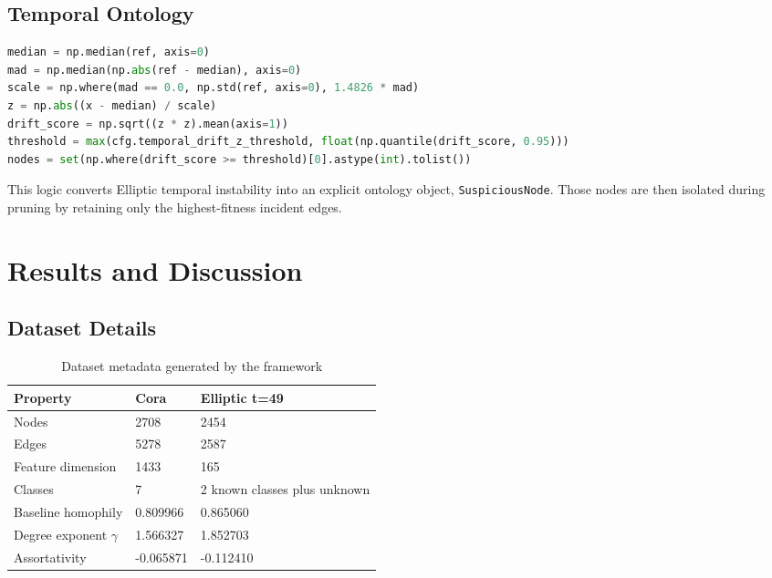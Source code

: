 \documentclass[12pt,oneside]{report}
\begin{document}
\section{Temporal Ontology}
\begin{lstlisting}[language=Python,caption={Temporal drift detection from defense/semantic_reasoning.py}]
median = np.median(ref, axis=0)
mad = np.median(np.abs(ref - median), axis=0)
scale = np.where(mad == 0.0, np.std(ref, axis=0), 1.4826 * mad)
z = np.abs((x - median) / scale)
drift_score = np.sqrt((z * z).mean(axis=1))
threshold = max(cfg.temporal_drift_z_threshold, float(np.quantile(drift_score, 0.95)))
nodes = set(np.where(drift_score >= threshold)[0].astype(int).tolist())
\end{lstlisting}

This logic converts Elliptic temporal instability into an explicit ontology object, \texttt{SuspiciousNode}. Those nodes are then isolated during pruning by retaining only the highest-fitness incident edges.

\chapter{Results and Discussion}
\section{Dataset Details}
\begin{table}[H]
\centering
\caption{Dataset metadata generated by the framework}
\begin{tabular}{p{2.0in}p{1.5in}p{1.5in}}
\toprule
\textbf{Property} & \textbf{Cora} & \textbf{Elliptic t=49}\\
\midrule
Nodes & 2708 & 2454\\
Edges & 5278 & 2587\\
Feature dimension & 1433 & 165\\
Classes & 7 & 2 known classes plus unknown\\
Baseline homophily & 0.809966 & 0.865060\\
Degree exponent \(\gamma\) & 1.566327 & 1.852703\\
Assortativity & -0.065871 & -0.112410\\
\bottomrule
\end{tabular}
\end{table}
\end{document}
